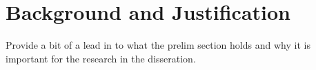 \section{Background and Justification}
\label{sec:background}
Provide a bit of a lead in to what the prelim section holds and why it is important for the research in the disseration.